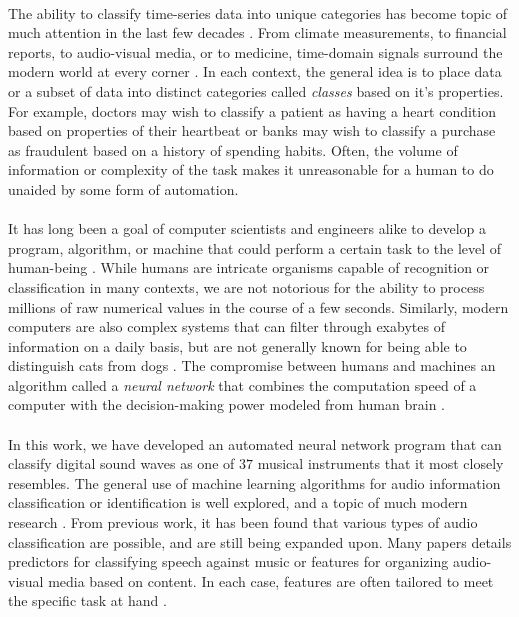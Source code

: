 \documentclass[12pt,letterpaper]{article}
\begin{document}
\paragraph*{}The ability to classify time-series data into unique categories has become topic of much attention in the last few decades \cite{Khan,Mierswa}. From climate measurements, to financial reports, to audio-visual media, or to medicine, time-domain signals surround the modern world at every corner \cite{Virtanen}. In each context, the general idea is to place data or a subset of data into distinct categories called \textit{classes} based on it's properties. For example, doctors may wish to classify a patient as having a heart condition based on properties of their heartbeat or banks may wish to classify a purchase as fraudulent based on a history of spending habits. Often, the volume  of information or complexity of the task makes it unreasonable for a human to do unaided by some form of automation.

\paragraph*{}It has long been a goal of computer scientists and engineers alike to develop a program, algorithm, or machine that could perform a certain task to the level of human-being \cite{Bishop,Geron,Loy}. While humans are intricate organisms capable of recognition or classification in many contexts, we are not notorious for the ability to process millions of raw numerical values in the course of a few seconds. Similarly, modern computers are also complex systems that can filter through exabytes of information on a daily basis, but are not generally known for being able to distinguish cats from dogs \cite{Geron}. The compromise between humans and machines an algorithm called a \textit{neural network} that combines the computation speed of a computer with the decision-making power modeled from human brain \cite{Goodfellow,Levine,Loy}.

\paragraph*{}In this work, we have developed an automated neural network program that can classify digital sound waves as one of $37$ musical instruments that it most closely resembles. The general use of machine learning algorithms for audio information classification or identification is well explored, and a topic of much modern research \cite{Khan,Liu,Mierswa,Serizel,Zhang}. From previous work, it has been found that various types of audio classification are possible, and are still being expanded upon. Many papers details predictors for classifying speech against music or features for organizing audio-visual media based on content. In each case, features are often tailored to meet the specific task at hand \cite{Virtan,Liu}.
\end{document}
